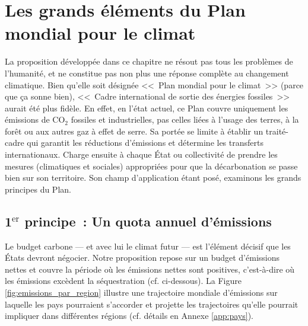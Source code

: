 \documentclass[a5paper,french,openany]{memoir}
\begin{document}
\chapter{Les grands éléments du Plan mondial pour le climat\label{ch:principes}}

La proposition développée dans ce chapitre ne résout pas tous les problèmes de l'humanité, et ne constitue pas non plus une réponse complète au changement climatique. Bien qu'elle soit désignée <<~Plan mondial pour le climat~>> (parce que ça sonne bien), <<~Cadre international de sortie des énergies fossiles~>> aurait été plus fidèle.  %
En effet, en l'état actuel, ce Plan couvre uniquement les émissions de CO$_\text{2}$ fossiles et industrielles, pas celles liées à l'usage des terres, à la forêt ou aux autres gaz à effet de serre. %
Sa portée se limite à établir un traité-cadre qui garantit les réductions d'émissions et détermine les transferts internationaux. Charge ensuite à chaque État ou collectivité de prendre les mesures (climatiques et sociales) appropriées pour que la décarbonation se passe bien sur son territoire. Son champ d'application étant posé, %
examinons les grands principes du Plan.

\section{1$^\text{er}$ principe~: Un quota annuel d'émissions}\label{sec:pcp_quota}

Le budget carbone --- et avec lui le climat futur --- est l'élément décisif que les États devront négocier. 
Notre proposition repose sur un budget d'émissions nettes et couvre la période où les émissions nettes sont positives, c'est-à-dire où les émissions excèdent la séquestration (cf. ci-dessous). La Figure \ref{fig:emissions_par_region} illustre une trajectoire mondiale d'émissions sur laquelle les pays pourraient s'accorder et projette les trajectoires qu'elle pourrait impliquer dans différentes régions (cf. détails en Annexe \ref{app:pays}). 
\end{document}
